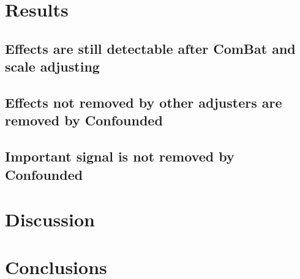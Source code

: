\documentclass[notitlepage]{article}
\begin{document}
\section{Results} \label{results}


\subsection{Effects are still detectable after ComBat and scale adjusting}

\subsection{Effects not removed by other adjusters are removed by Confounded}

\subsection{Important signal is not removed by Confounded}

\section{Discussion}

\section{Conclusions}


\end{document}
